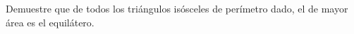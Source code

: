 \item Demuestre que de todos los triángulos isósceles de perímetro dado, el de mayor área es el equilátero.
